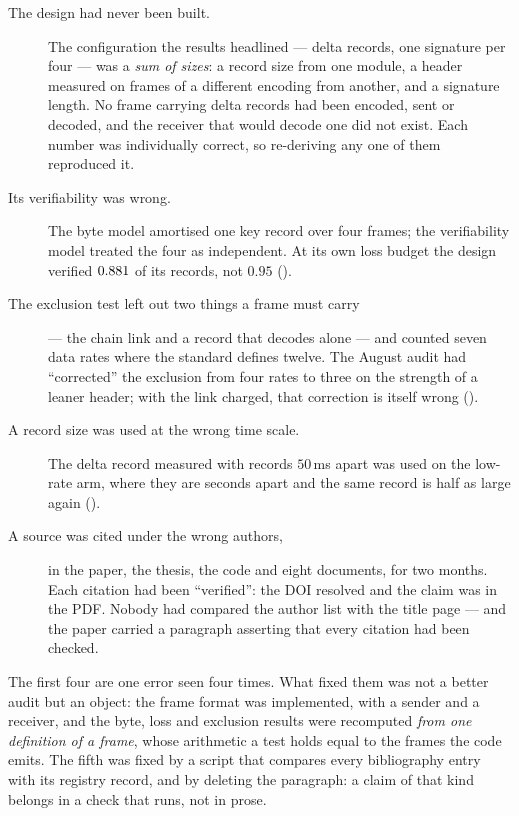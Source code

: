 \begin{description}
\item[The design had never been built.] The configuration the results headlined --- delta
records, one signature per four --- was a \emph{sum of sizes}: a record size from one module, a
header measured on frames of a different encoding from another, and a signature length. No frame
carrying delta records had been encoded, sent or decoded, and the receiver that would decode one
did not exist. Each number was individually correct, so re-deriving any one of them reproduced it.

\item[Its verifiability was wrong.] The byte model amortised one key record over four frames; the
verifiability model treated the four as independent. At its own loss budget the design verified
$0.881$ of its records, not $0.95$ ().

\item[The exclusion test left out two things a frame must carry] --- the chain link and a record
that decodes alone --- and counted seven data rates where the standard defines twelve. The
August audit had ``corrected'' the exclusion from four rates to three on the strength of a leaner
header; with the link charged, that correction is itself wrong ().

\item[A record size was used at the wrong time scale.] The delta record measured with records
$50$\,ms apart was used on the low-rate arm, where they are seconds apart and the same record is
half as large again ().

\item[A source was cited under the wrong authors,] in the paper, the thesis, the code and eight
documents, for two months. Each citation had been ``verified'': the DOI resolved and the claim
was in the PDF. Nobody had compared the author list with the title page --- and the paper carried
a paragraph asserting that every citation had been checked.
\end{description}

The first four are one error seen four times. What fixed them was not a better audit but an
object: the frame format was implemented, with a sender and a receiver, and the byte, loss and
exclusion results were recomputed \emph{from one definition of a frame}, whose arithmetic a test
holds equal to the frames the code emits. The fifth was fixed by a script that compares every
bibliography entry with its registry record, and by deleting the paragraph: a claim of that kind
belongs in a check that runs, not in prose.

